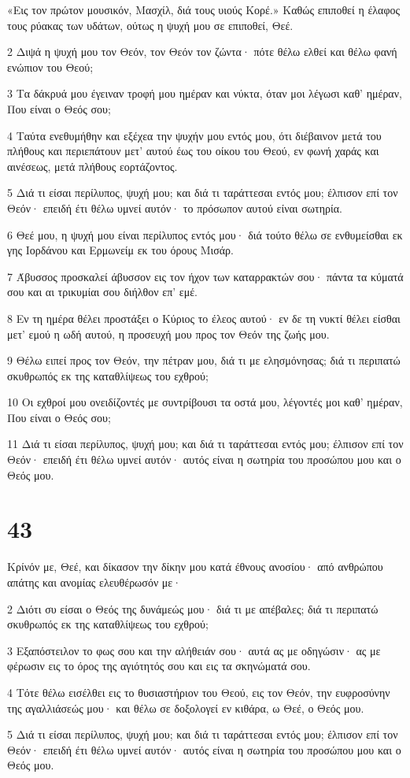 \par «Εις τον πρώτον μουσικόν, Μασχίλ, διά τους υιούς Κορέ.» Καθώς επιποθεί η έλαφος τους ρύακας των υδάτων, ούτως η ψυχή μου σε επιποθεί, Θεέ.
\par 2 Διψά η ψυχή μου τον Θεόν, τον Θεόν τον ζώντα· πότε θέλω ελθεί και θέλω φανή ενώπιον του Θεού;
\par 3 Τα δάκρυά μου έγειναν τροφή μου ημέραν και νύκτα, όταν μοι λέγωσι καθ' ημέραν, Που είναι ο Θεός σου;
\par 4 Ταύτα ενεθυμήθην και εξέχεα την ψυχήν μου εντός μου, ότι διέβαινον μετά του πλήθους και περιεπάτουν μετ' αυτού έως του οίκου του Θεού, εν φωνή χαράς και αινέσεως, μετά πλήθους εορτάζοντος.
\par 5 Διά τι είσαι περίλυπος, ψυχή μου; και διά τι ταράττεσαι εντός μου; έλπισον επί τον Θεόν· επειδή έτι θέλω υμνεί αυτόν· το πρόσωπον αυτού είναι σωτηρία.
\par 6 Θεέ μου, η ψυχή μου είναι περίλυπος εντός μου· διά τούτο θέλω σε ενθυμείσθαι εκ γης Ιορδάνου και Ερμωνείμ εκ του όρους Μισάρ.
\par 7 Άβυσσος προσκαλεί άβυσσον εις τον ήχον των καταρρακτών σου· πάντα τα κύματά σου και αι τρικυμίαι σου διήλθον επ' εμέ.
\par 8 Εν τη ημέρα θέλει προστάξει ο Κύριος το έλεος αυτού· εν δε τη νυκτί θέλει είσθαι μετ' εμού η ωδή αυτού, η προσευχή μου προς τον Θεόν της ζωής μου.
\par 9 Θέλω ειπεί προς τον Θεόν, την πέτραν μου, διά τι με ελησμόνησας; διά τι περιπατώ σκυθρωπός εκ της καταθλίψεως του εχθρού;
\par 10 Οι εχθροί μου ονειδίζοντές με συντρίβουσι τα οστά μου, λέγοντές μοι καθ' ημέραν, Που είναι ο Θεός σου;
\par 11 Διά τι είσαι περίλυπος, ψυχή μου; και διά τι ταράττεσαι εντός μου; έλπισον επί τον Θεόν· επειδή έτι θέλω υμνεί αυτόν· αυτός είναι η σωτηρία του προσώπου μου και ο Θεός μου.

\chapter{43}

\par Κρίνόν με, Θεέ, και δίκασον την δίκην μου κατά έθνους ανοσίου· από ανθρώπου απάτης και ανομίας ελευθέρωσόν με·
\par 2 Διότι συ είσαι ο Θεός της δυνάμεώς μου· διά τι με απέβαλες; διά τι περιπατώ σκυθρωπός εκ της καταθλίψεως του εχθρού;
\par 3 Εξαπόστειλον το φως σου και την αλήθειάν σου· αυτά ας με οδηγώσιν· ας με φέρωσιν εις το όρος της αγιότητός σου και εις τα σκηνώματά σου.
\par 4 Τότε θέλω εισέλθει εις το θυσιαστήριον του Θεού, εις τον Θεόν, την ευφροσύνην της αγαλλιάσεώς μου· και θέλω σε δοξολογεί εν κιθάρα, ω Θεέ, ο Θεός μου.
\par 5 Διά τι είσαι περίλυπος, ψυχή μου; και διά τι ταράττεσαι εντός μου; έλπισον επί τον Θεόν· επειδή έτι θέλω υμνεί αυτόν· αυτός είναι η σωτηρία του προσώπου μου και ο Θεός μου.

